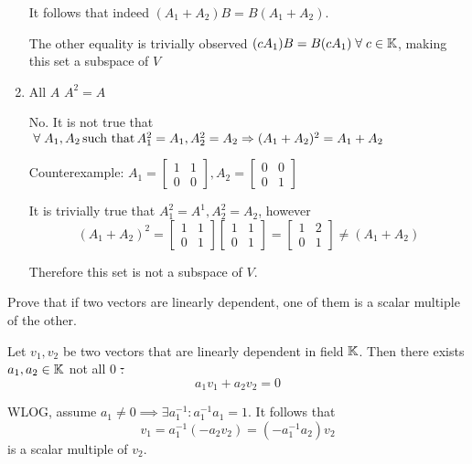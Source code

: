 \documentclass[a4paper, 11pt]{article}
\begin{document}
\begin{solution}
\begin{enumerate}
              It follows that indeed \((A_1 + A_2) B = B(A_1 + A_2)\).

              The other equality is trivially observed \((c A_1) B = B (c A_1) \forall c \in \bbk\), making this set a subspace of \(V\)


        \item All \(A\) \st \(A^2 = A\)

              No. It is not true that \(\forall A_1, A_2 \st A_1^2 = A_1, A_2^2 = A_2 \implies (A_1 + A_2)^2 = A_1 + A_2\)

              Counterexample: \(A_1 = \left[\begin{array}{cc}
                      1 & 1 \\
                      0 & 0
                  \end{array}\right], A_2 = \left[\begin{array}{cc}
                      0 & 0 \\
                      0 & 1
                  \end{array}\right]\)

              It is trivially true that \(A_1^2 = A^1, A_2^2 = A_2\), however \[
                  (A_1 + A_2)^2 = \left[\begin{array}{cc}
                          1 & 1 \\
                          0 & 1
                      \end{array}\right]\left[\begin{array}{cc}
                          1 & 1 \\
                          0 & 1
                      \end{array}\right] = \left[\begin{array}{cc}
                          1 & 2 \\
                          0 & 1
                      \end{array}\right] \neq (A_1 + A_2)
              \]

              Therefore this set is not a subspace of \(V\).
    \end{enumerate}

\end{solution}

\begin{problem} 
Prove that if two vectors are linearly dependent, one of them is a scalar multiple of the other.
\end{problem}
\begin{solution}
    Let \(v_1, v_2\) be two vectors that are linearly dependent in field \(\mathbb{K}\). Then there exists \(a_1, a_2 \in \mathbb{K}\) not all 0 \st:
    \begin{equation*}
        a_1v_1 + a_2v_2 = 0
    \end{equation*}

    WLOG, assume \(a_1 \neq 0 \implies \exists a_1^{-1}: a_1^{-1}a_1 = 1\). It follows that \[
        v_1 = a_1^{-1}(-a_2v_2) = (-a_1^{-1}a_2)v_2
    \]
    is a scalar multiple of \(v_2\).
\end{solution}
\end{document}
